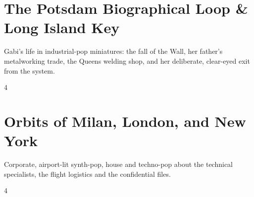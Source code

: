 \documentclass[a4paper,landscape]{memoir}
\begin{document}
\chapter{The Potsdam Biographical Loop \& Long Island Key}
Gabi’s life in industrial-pop miniatures: the fall of the Wall, her father’s metalworking trade, the Queens welding shop, and her deliberate, clear-eyed exit from the system.
\clearpage\begin{multicols*}{4}
\end{multicols*}

\chapter{Orbits of Milan, London, and New York}
Corporate, airport-lit synth-pop, house and techno-pop about the technical specialists, the flight logistics and the confidential files.
\clearpage\begin{multicols*}{4}
\end{multicols*}
\end{document}
